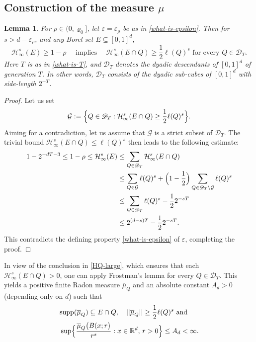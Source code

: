 \documentclass[a4paper,11pt]{amsart}
\newtheorem{lem}[thm]{\bf Lemma}
\numberwithin{equation}{section}
\begin{document}
\subsection{Construction of the measure $\mu$} 
\begin{lem} 
For $\rho \in (0, \varrho_0]$, let $\varepsilon = \varepsilon_{\rho}$ be as in \eqref{what-is-epsilon}. Then for $s > d - \varepsilon_{\rho}$, and any Borel set $E \subseteq [0,1]^d$,
\begin{equation} 
\mathcal H^s_{\infty}(E) \geq 1- \rho \quad \text{ implies }  \quad \mathcal H_{\infty}^s(E \cap Q) \geq \frac{1}{2} \ell(Q)^s \text{ for every } Q \in \mathscr{D}_T.   \label{HQ-large}
\end{equation}   
\noindent Here $T$ is as in \eqref{what-is-T}, and $\mathscr {D}_T$ denotes the dyadic descendants of $[0,1]^d$ of generation $T$. In other words, $\mathscr{D}_T$ consists of the dyadic sub-cubes of $[0,1]^d$ with side-length $2^{-T}$. 
\end{lem} 
\begin{proof} 
Let us set 
\[ \mathcal G := \Bigl\{Q \in \mathscr{D}_T : \mathcal H_{\infty}^s(E \cap Q) \geq \frac{1}{2} \ell(Q)^s \Bigr\}. \]
Aiming for a contradiction, let us assume that $\mathcal G$ is a strict subset of $\mathscr{D}_T$. The trivial bound $\mathcal H_{\infty}^s(E \cap Q) \leq \ell(Q)^s$ then leads to the following estimate:   
\begin{align*} 
1 - 2^{-dT-3} \leq 1 - \rho \leq \mathcal H^s_{\infty}(E) & \leq \sum_{Q \in \mathscr{D}_T}  \mathcal H^s_{\infty}(E \cap Q)
\\ 
&\leq \sum_{Q \in \mathcal G}  \ell(Q)^s + \Bigl( 1 - \frac{1}{2} \Bigr) \sum_{Q \in \mathscr{D}_T \setminus \mathcal G} \ell(Q)^s \\ 
&\leq \sum_{Q \in \mathscr{D}_T} \ell(Q)^s - \frac{1}{2} 2^{-sT} \\ 
&\leq 2^{(d-s)T} -  \frac{1}{2} 2^{-sT}.  
\end{align*} 
This contradicts the defining property \eqref{what-is-epsilon} of $\varepsilon$, completing the proof.  
\end{proof} 
\noindent In view of the conclusion in \eqref{HQ-large}, which ensures that each $\mathcal H^s_{\infty}(E \cap Q) > 0$, one can apply Frostman's lemma \cite[Theorem 8.8] {Mattila-Book1}  for every $Q \in \mathscr{D}_T$. This yields a positive finite Radon measure $\overline{\mu}_Q$ and an absolute constant $A_d > 0$ (depending only on $d$) such that 
 \begin{align} 
&\text{supp}(\overline{\mu}_Q) \subseteq E \cap Q, \quad ||\overline{\mu}_Q|| \geq \frac{1}{2} \ell(Q)^s \text{ and } \label{nu-supp-wt} \\ 
&\sup\Bigl\{\frac{\overline{\mu}_Q \bigl(B(x;r\bigr)}{r^s} : x \in \mathbb R^d, \, r > 0 \Bigr\} \leq A_d < \infty. \label{nu-ball-condition}  
\end{align}  
\end{document}
